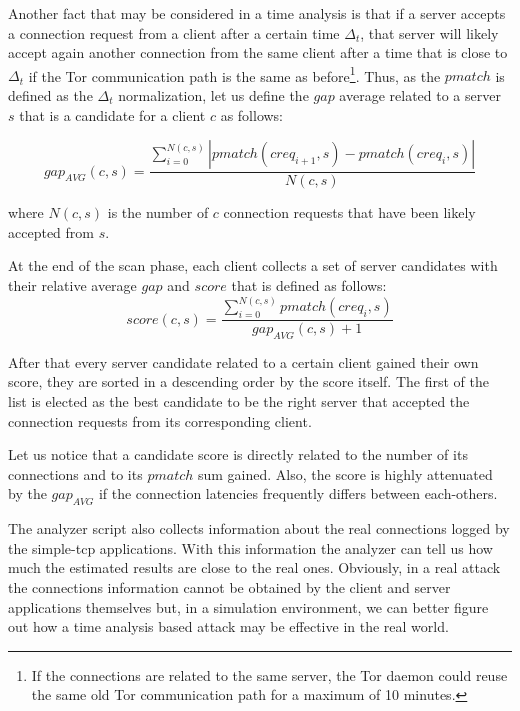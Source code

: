 Another fact that may be considered in a time analysis is that if a server accepts a
connection request from a client after a certain time $\Delta_t$, that
server will likely accept again another connection from the same client
after a time that is close to $\Delta_t$ if the Tor communication path is the same as
before\footnote{If the connections are related to the same server, the Tor
daemon could reuse the same old Tor communication path for a maximum
of 10 minutes\cite{tormanual}.}.                                                             
Thus, as the $pmatch$ is defined as the $\Delta_t$ normalization, 
let us define the $gap$ average related to a 
server $s$ that is a candidate for a client $c$ as follows:

\begin{equation}
\label{eq:gap}
 gap_{AVG}(c,s) = \frac{\sum\limits^{N(c,s)}_{i=0} | pmatch(creq_{i+1},s) -
pmatch(creq_{i},s)
|}{N(c,s)}
\end{equation}

where $N(c,s)$ is the number of $c$ connection requests that have been likely 
accepted from $s$.


At the end of the scan phase, each client collects a set of server
candidates with their relative average $gap$ and $score$ that is defined
as follows:
\begin{equation}
	score(c,s) = \frac{\sum\limits^{N(c,s)}_{i=0} pmatch(creq_{i},s)}{gap_{AVG}(c,s) + 1}
\end{equation}

After that every server candidate related to a certain client gained
their own score, they are sorted in a descending order by the score
itself. The first of the list is elected as the best candidate to be the
right server that accepted the connection requests from its corresponding
client.

Let us notice that a candidate score is directly related to the number
of its connections and to its $pmatch$ sum gained.
Also, the score is highly attenuated by the $gap_{AVG}$ if the connection
latencies frequently differs between each-others.


The analyzer script also collects information about the
real connections logged by the simple-tcp applications. With this
information the analyzer can tell us how much the estimated results are
close to the real ones. Obviously, in a real attack the connections
information cannot be obtained by the client and server applications themselves
but, in a simulation environment, we can better figure out how a time
analysis based attack may be effective in the real world.

